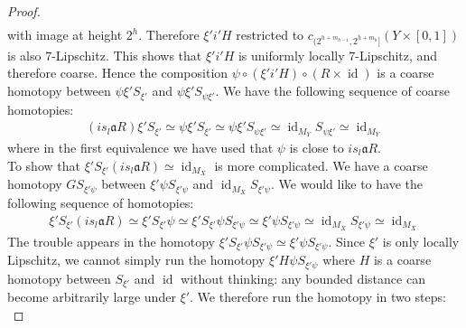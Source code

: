 \documentclass[10pt,a4paper]{amsart}
\DeclareMathOperator{\id}{id}
\begin{document}
\begin{proof}
\begin{align*}
\end{align*}
with image at height $2^{h}$. Therefore $\xi' i' H$ restricted to $c_{(2^{h+m_{h-1}},2^{h+m_{h}}]}(Y\times [0,1])$ is also $7$-Lipschitz. This shows that $\xi' i' H$ is uniformly locally $7$-Lipschitz, and therefore coarse. Hence the composition $\psi \circ (\xi' i' H)\circ (R\times \id)$ is a coarse homotopy between $\psi \xi' S_{\xi'}$ and $\psi \xi' S_{\psi \xi'}$. We have the following sequence of coarse homotopies:
\begin{align*}
(is_{l}\mathfrak{a}R) \xi' S_{\xi'} \simeq \psi \xi' S_{\xi'} \simeq \psi \xi' S_{\psi \xi'} \simeq \id_{M_{Y}} S_{\psi \xi'} \simeq \id_{M_{Y}}
\end{align*}
where in the first equivalence we have used that $\psi$ is close to $is_{l}\mathfrak{a} R$.\\

 To show that $ \xi' S_{\xi'} (is_{l}\mathfrak{a}R) \simeq \id_{M_{X}}$ is more complicated. 
We have a coarse homotopy $GS_{\xi' \psi}$ between $\xi' \psi S_{\xi' \psi}$ and $\id_{M_{X}} S_{\xi' \psi}$. We would like to have the following sequence of homotopies:
\begin{align*}
 \xi' S_{\xi'} (is_{l}\mathfrak{a}R) \simeq   \xi' S_{\xi'} \psi \simeq \xi' S_{\xi'} \psi S_{\xi' \psi} \simeq \xi' \psi S_{\xi' \psi} \simeq \id_{M_{X}} S_{\xi' \psi} \simeq \id_{M_{X}}
\end{align*}
The trouble appears in the homotopy $ \xi' S_{\xi'} \psi S_{\xi' \psi} \simeq \xi' \psi S_{\xi' \psi}$. Since $\xi'$ is only locally Lipschitz, we cannot simply run the homotopy $\xi' H \psi S_{\xi' \psi}$ where $H$ is a coarse homotopy between $S_{\xi'}$ and $\id$ without thinking: any bounded distance can become arbitrarily large under $\xi'$. We therefore run the homotopy in two steps:\\


\end{proof}
\end{document}
